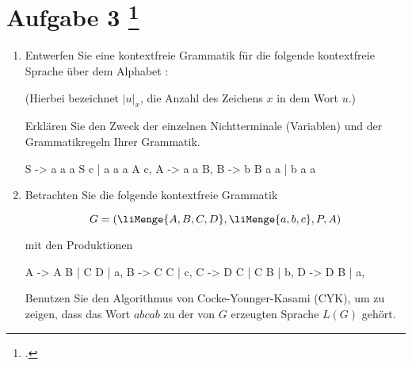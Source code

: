 \documentclass{lehramt-informatik-aufgabe}
\begin{document}
\let\m=\liMenge
{}
\section{Aufgabe 3
\footcite{66115:2020:03}}

\begin{enumerate}


\item Entwerfen Sie eine kontextfreie Grammatik für die folgende
kontextfreie Sprache über dem Alphabet :

\begin{center}
\end{center}

(Hierbei bezeichnet $|u|_x$, die Anzahl des Zeichens $x$ in dem Wort $u$.)

Erklären Sie den Zweck der einzelnen Nichtterminale (Variablen) und der
Grammatikregeln Ihrer Grammatik.

\begin{liAntwort}
\begin{liProduktionsRegeln}
S -> a a a S c | a a a A c,
A -> a a B,
B -> b B a a | b a a
\end{liProduktionsRegeln}
\end{liAntwort}


\item Betrachten Sie die folgende kontextfreie Grammatik

\begin{displaymath}
G=(\m{A,B,C,D}, \m{a,b,c}, P, A)
\end{displaymath}

mit den Produktionen

\begin{liProduktionsRegeln}
A -> A B | C D | a,
B -> C C | c,
C -> D C | C B | b,
D -> D B | a,
\end{liProduktionsRegeln}

Benutzen Sie den Algorithmus von Cocke-Younger-Kasami (CYK), um zu
zeigen, dass das Wort $abcab$ zu der von $G$ erzeugten Sprache $L(G)$
gehört.


\end{enumerate}
\end{document}

